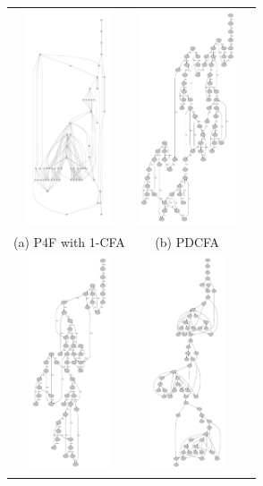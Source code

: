 \documentclass[12pt]{report}
\begin{document}
\begin{figure}
\begin{center}
\begin{tabular}{ccc}
\includegraphics[height=2.5in]{1p4f.pdf}
&
\includegraphics[height=2.5in]{pdcfaWOgc.pdf}
\\
(a) P4F with 1-CFA
&
(b) PDCFA
\\
\includegraphics[height=2.5in]{pdcfa.pdf}
&
\includegraphics[height=2.5in]{hcfa.pdf}

\end{tabular}
\end{center}
\end{figure}
\end{document}
